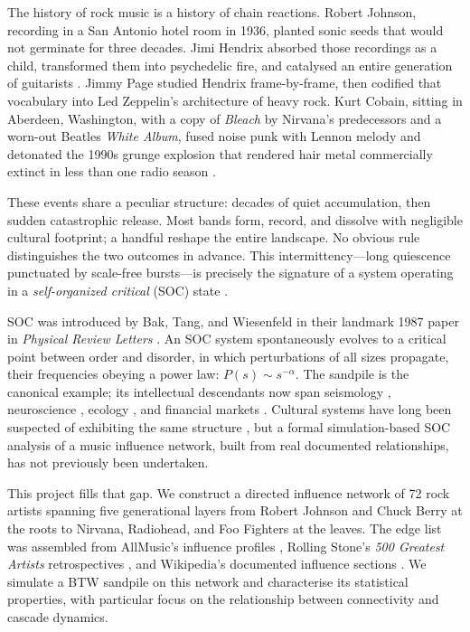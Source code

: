 \documentclass[12pt, a4paper]{article}
\begin{document}
The history of rock music is a history of chain reactions.
Robert Johnson, recording in a San Antonio hotel room in 1936,
planted sonic seeds that would not germinate for three decades.
Jimi Hendrix absorbed those recordings as a child, transformed them
into psychedelic fire, and catalysed an entire generation of
guitarists \citep{shadwick2003}.
Jimmy Page studied Hendrix frame-by-frame, then codified that
vocabulary into Led Zeppelin's architecture of heavy rock.
Kurt Cobain, sitting in Aberdeen, Washington, with a copy of
\textit{Bleach} by Nirvana's predecessors and a worn-out
Beatles \textit{White Album}, fused noise punk with Lennon melody
and detonated the 1990s grunge explosion that rendered hair metal
commercially extinct in less than one radio season
\citep{azerrad1994, cross2001}.

These events share a peculiar structure: decades of quiet
accumulation, then sudden catastrophic release.
Most bands form, record, and dissolve with negligible cultural
footprint; a handful reshape the entire landscape.
No obvious rule distinguishes the two outcomes in advance.
This intermittency---long quiescence punctuated by scale-free
bursts---is precisely the signature of a system operating in a
\textit{self-organized critical} (SOC) state
\citep{bak1987, bak1996}.

SOC was introduced by Bak, Tang, and Wiesenfeld in their
landmark 1987 paper in \textit{Physical Review Letters}
\citep{bak1987}.
An SOC system spontaneously evolves to a critical point between
order and disorder, in which perturbations of all sizes propagate,
their frequencies obeying a power law: $P(s) \sim s^{-\alpha}$.
The sandpile is the canonical example; its intellectual descendants
now span seismology \citep{gutenberg1944}, neuroscience
\citep{beggs2003}, ecology \citep{sole1999}, and financial markets
\citep{mantegna1999}.
Cultural systems have long been suspected of exhibiting the same
structure \citep{salganik2006, mauch2015}, but a formal
simulation-based SOC analysis of a music influence network,
built from real documented relationships, has not previously
been undertaken.

This project fills that gap.
We construct a directed influence network of 72 rock artists
spanning five generational layers from Robert Johnson and
Chuck Berry at the roots to Nirvana, Radiohead, and Foo Fighters
at the leaves.
The edge list was assembled from AllMusic's influence
profiles \citep{allmusic2024}, Rolling Stone's
\textit{500 Greatest Artists} retrospectives
\citep{rollingstoneartists}, and Wikipedia's documented
influence sections \citep{wikifluence2024}.
We simulate a BTW sandpile on this network and characterise its
statistical properties, with particular focus on the relationship
between connectivity and cascade dynamics.
\end{document}
